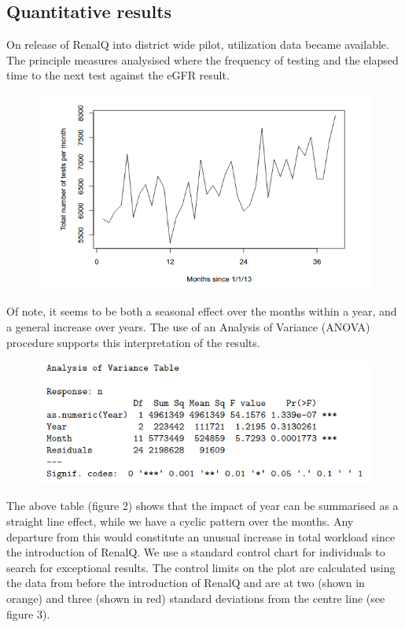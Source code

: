 ﻿\documentclass[11pt]{article}
\begin{document}
\subsection{Quantitative results}
On release of RenalQ into district wide pilot, utilization data became available. The principle measures analysised where the frequency of testing and the elapsed time to the next test against the eGFR result.\\

\begin{figure}[htp]
\centering
\includegraphics[scale=0.50]{Fig1.png}
\caption{}
\label{}
\end{figure}

Of note, it seems to be both a seasonal effect over the months within a year, and a general increase over years.  The use of an Analysis of Variance (ANOVA) procedure supports this interpretation of the results.\\

\begin{figure}[htp]
\centering
\includegraphics[scale=0.50]{fig2.png}
\caption{}
\label{}
\end{figure}

The above table (figure 2) shows that the impact of year can be summarised as a straight line effect, while we have a cyclic pattern over the months. Any departure from this would constitute an unusual increase in total workload since the introduction of RenalQ. We use a standard control chart for individuals to search for exceptional results. The control limits on the plot are calculated using the data from before the introduction of RenalQ and are at two (shown in orange) and three (shown in red) standard deviations from the centre line (see figure 3).\\
\end{document}
